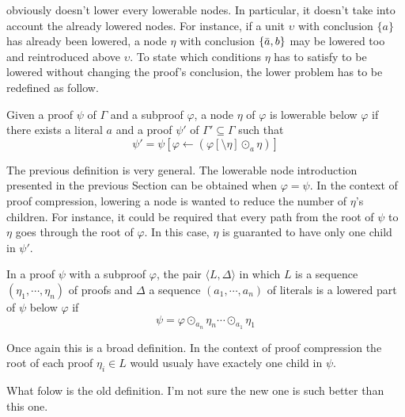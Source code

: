 \documentclass{llncs}
\begin{document}
{\LowerUnits} obviously doesn't lower every lowerable nodes. In particular, it doesn't take into
account the already lowered nodes. For instance, if a unit $\upsilon$ with conclusion $\{a\}$ has already been
lowered, a node $\eta$ with conclusion $\{\bar{a},b\}$ may be lowered too and reintroduced above
$\upsilon$. To state which conditions $\eta$ has to satisfy to be lowered without changing the
proof's conclusion, the lower problem has to be redefined as follow.

\begin{definition}
Given a proof $\psi$ of $\Gamma$ and a subproof $\varphi$, a node $\eta$ of $\varphi$ is lowerable
below $\varphi$ if there exists a literal $a$ and a proof $\psi'$ of $\Gamma' \subseteq
\Gamma$ such that
\begin{equation}
  \psi' = \psi[\varphi \leftarrow (\varphi[\setminus \eta] \odot_a \eta)]
\end{equation}
\end{definition}
The previous definition is very general. The lowerable node introduction presented in the previous
Section can be obtained when $\varphi = \psi$. In the context of proof compression, lowering a node
is wanted to reduce the number of $\eta$'s children. For instance, it could be required that every
path from the root of $\psi$ to $\eta$ goes through the root of $\varphi$. In this case, $\eta$ is
guaranted to have only one child in $\psi'$.

\begin{definition}
In a proof $\psi$ with a subproof $\varphi$, the pair $\langle L,\Delta \rangle$ in which $L$ is a
sequence $(\eta_1,\cdots,\eta_n)$ of proofs and $\Delta$ a sequence $(a_1,\cdots,a_n)$ of literals
is a lowered part of $\psi$ below $\varphi$ if
\begin{equation}
  \psi = \varphi \odot_{a_n} \eta_n \cdots \odot_{a_1} \eta_1
\end{equation}
\end{definition}
Once again this is a broad definition. In the context of proof compression the root of each proof
$\eta_i \in L$ would usualy have exactely one child in $\psi$.



\begin{jb}
What folow is the old definition. I'm not sure the new one is such better than this one.
\end{jb}
\end{document}
